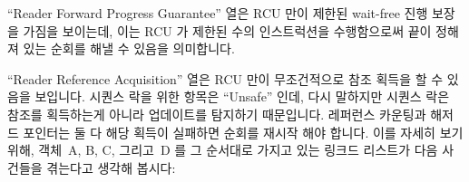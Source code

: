 ``Reader Forward Progress Guarantee'' 열은 RCU 만이 제한된 wait-free 진행
보장을 가짐을 보이는데, 이는 RCU 가 제한된 수의 인스트럭션을 수행함으로써 끝이
정해져 있는 순회를 해낼 수 있음을 의미합니다.

``Reader Reference Acquisition'' 열은 RCU 만이 무조건적으로 참조 획득을 할 수
있음을 보입니다.
시퀀스 락을 위한 항목은 ``Unsafe'' 인데, 다시 말하지만 시퀀스 락은 참조를
획득하는게 아니라 업데이트를 탐지하기 때문입니다.
레퍼런스 카운팅과 해저드 포인터는 둘 다 해당 획득이 실패하면 순회를 재시작 해야
합니다.
이를 자세히 보기 위해, 객체~A, B, C, 그리고~D 를 그 순서대로 가지고 있는 링크드
리스트가 다음 사건들을 겪는다고 생각해 봅시다:

\iffalse

The ``Reader Forward Progress Guarantee'' row shows that only RCU
has a bounded wait-free forward-progress guarantee, which means that
it can carry out a finite traversal by executing a bounded number of
instructions.

The ``Reader Reference Acquisition'' rows indicates that only RCU is
capable of unconditionally acquiring references.
The entry for sequence locks is ``Unsafe'' because, again, sequence locks
detect updates rather than acquiring references.
Reference counting and hazard pointers both require that traversals be
restarted from the beginning if a given acquisition fails.
To see this, consider a linked list containing objects~A, B, C, and~D,
in that order, and the following series of events:

\fi

